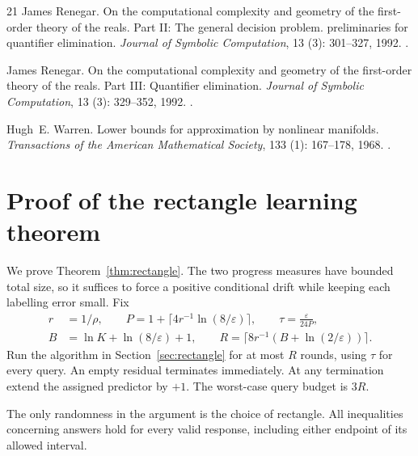 \documentclass[11pt,letterpaper,pmlr,twoside]{jmlr}
\newcommand{\eps}{\varepsilon}
\newcommand{\ceil}[1]{\lceil #1\rceil}
\begin{document}
\begin{thebibliography}{21}
James Renegar.
\newblock On the computational complexity and geometry of the first-order
  theory of the reals. {Part II}: The general decision problem. preliminaries
  for quantifier elimination.
\newblock \emph{Journal of Symbolic Computation}, 13 (3):
  301--327, 1992{}.
\newblock {}.

James Renegar.
\newblock On the computational complexity and geometry of the first-order
  theory of the reals. {Part III}: Quantifier elimination.
\newblock \emph{Journal of Symbolic Computation}, 13 (3):
  329--352, 1992{}.
\newblock {}.

Hugh~E. Warren.
\newblock Lower bounds for approximation by nonlinear manifolds.
\newblock \emph{Transactions of the American Mathematical Society},
  133 (1): 167--178, 1968.
\newblock {}.

\end{thebibliography}

\clearpage
\appendix

\section{Proof of the rectangle learning theorem}\label{app:rectangle}
We prove Theorem~\ref{thm:rectangle}. The two progress measures have bounded total size, so it suffices to force a positive conditional drift while keeping each labelling error small. Fix
\begin{align}
 r&=1/\rho,\qquad P=1+\ceil{4r^{-1}\ln(8/\eps)},\qquad
 \tau=\frac{\eps}{24P},\label{eq:rectparams1}\\
 B&=\ln K+\ln(8/\eps)+1,\qquad
 R=\ceil{8r^{-1}(B+\ln(2/\eps))}.\label{eq:rectparams2}
\end{align}
Run the algorithm in Section~\ref{sec:rectangle} for at most $R$ rounds, using $\tau$ for every query. An empty residual terminates immediately. At any termination extend the assigned predictor by $+1$. The worst-case query budget is $3R$.

The only randomness in the argument is the choice of rectangle. All inequalities concerning answers hold for every valid response, including either endpoint of its allowed interval.
\end{document}
